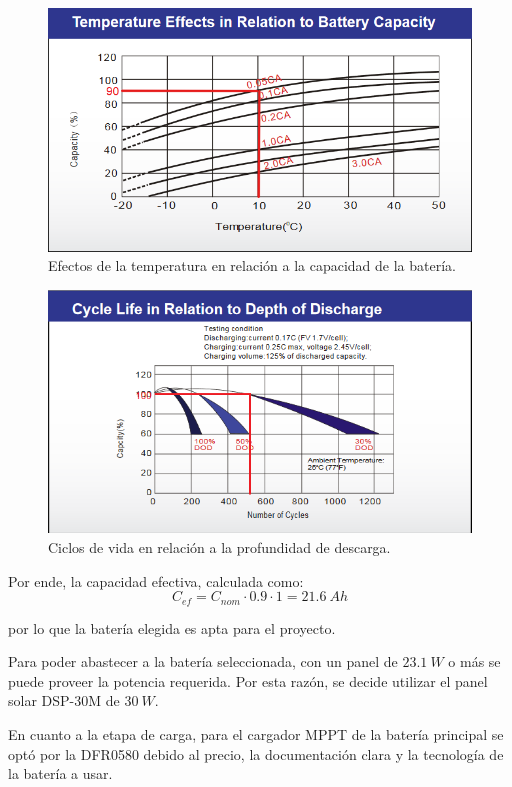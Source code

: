 \begin{figure}[H]
	\centering
	\includegraphics[width=0.9\linewidth]{ImagenesFactibilidad/UL24-12_Ctemp}	
	\caption{Efectos de la temperatura en relación a la capacidad de la batería.}
	\label{fig:ctemp}
\end{figure}

\begin{figure}[H]
	\centering
	\includegraphics[width=0.9\linewidth]{ImagenesFactibilidad/UL24-12_Cdod}	
	\caption{Ciclos de vida en relación a la profundidad de descarga.}
	\label{fig:cdod}
\end{figure}

Por ende, la capacidad efectiva, calculada como:
\begin{equation}
C_{ef} = C_{nom} \cdot 0.9 \cdot 1 = 21.6 \ Ah
\end{equation}

por lo que la batería elegida es apta para el proyecto.


Para poder abastecer a la batería seleccionada, con un panel de $23.1 \ W$ o más se puede proveer la potencia requerida. Por esta razón, se decide utilizar el panel solar DSP-30M de $30 \ W$.

En cuanto a la etapa de carga, para el cargador MPPT de la batería principal se optó por la DFR0580 debido al precio, la documentación clara y la tecnología de la batería a usar.
